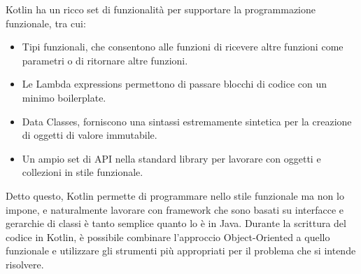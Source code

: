 Kotlin ha un ricco set di funzionalità per supportare la programmazione funzionale, tra cui:
\begin{itemize}
  \item Tipi funzionali, che consentono alle funzioni di ricevere altre funzioni come parametri o di ritornare altre funzioni.
  \item Le Lambda expressions permettono di passare blocchi di codice con un minimo boilerplate.
  \item Data Classes, forniscono una sintassi estremamente sintetica per la creazione di oggetti di valore immutabile.
  \item Un ampio set di API nella standard library per lavorare con oggetti e collezioni in stile funzionale.
\end{itemize}

Detto questo, Kotlin permette di programmare nello stile funzionale ma non lo impone,
e naturalmente lavorare con framework che sono basati su interfacce e gerarchie di classi
è tanto semplice quanto lo è in Java. Durante la scrittura del codice in Kotlin, è possibile
combinare l'approccio Object-Oriented a quello funzionale e utilizzare gli strumenti più appropriati
per il problema che si intende risolvere.\\

